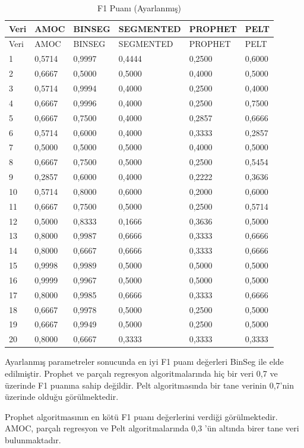 \documentclass[12pt,twoside]{deuthesis}
\begin{document}
\begin{longtable}[]{@{}llllll@{}}
\caption{\label{tab:nvar10} F1 Puanı (Ayarlanmış)}\tabularnewline
\toprule
Veri & AMOC & BINSEG & SEGMENTED & PROPHET & PELT\tabularnewline
\midrule
\endfirsthead
\toprule
Veri & AMOC & BINSEG & SEGMENTED & PROPHET & PELT\tabularnewline
\midrule
\endhead
1 & 0,5714 & 0,9997 & 0,4444 & 0,2500 & 0,6000\tabularnewline
2 & 0,6667 & 0,5000 & 0,5000 & 0,4000 & 0,5000\tabularnewline
3 & 0,5714 & 0,9994 & 0,4000 & 0,2500 & 0,4000\tabularnewline
4 & 0,6667 & 0,9996 & 0,4000 & 0,2500 & 0,7500\tabularnewline
5 & 0,6667 & 0,7500 & 0,4000 & 0,2857 & 0,6666\tabularnewline
6 & 0,5714 & 0,6000 & 0,4000 & 0,3333 & 0,2857\tabularnewline
7 & 0,5000 & 0,5000 & 0,5000 & 0,4000 & 0,5000\tabularnewline
8 & 0,6667 & 0,7500 & 0,5000 & 0,2500 & 0,5454\tabularnewline
9 & 0,2857 & 0,6000 & 0,4000 & 0,2222 & 0,3636\tabularnewline
10 & 0,5714 & 0,8000 & 0,6000 & 0,2000 & 0,6000\tabularnewline
11 & 0,6667 & 0,7500 & 0,5000 & 0,2500 & 0,5714\tabularnewline
12 & 0,5000 & 0,8333 & 0,1666 & 0,3636 & 0,5000\tabularnewline
13 & 0,8000 & 0,9987 & 0,6666 & 0,3333 & 0,6666\tabularnewline
14 & 0,8000 & 0,6667 & 0,6666 & 0,3333 & 0,6666\tabularnewline
15 & 0,9998 & 0,9989 & 0,5000 & 0,5000 & 0,5000\tabularnewline
16 & 0,9999 & 0,9967 & 0,5000 & 0,5000 & 0,5000\tabularnewline
17 & 0,8000 & 0,9985 & 0,6666 & 0,3333 & 0,6666\tabularnewline
18 & 0,6667 & 0,9978 & 0,5000 & 0,2500 & 0,5000\tabularnewline
19 & 0,6667 & 0,9949 & 0,5000 & 0,2500 & 0,5000\tabularnewline
20 & 0,8000 & 0,6667 & 0,3333 & 0,3333 & 0,3333\tabularnewline
\bottomrule
\end{longtable}

Ayarlanmış parametreler sonucunda en iyi F1 puanı değerleri BinSeg ile elde edilmiştir. Prophet ve parçalı regresyon algoritmalarında hiç bir veri 0,7 ve üzerinde F1 puanına sahip değildir. Pelt algoritmasında bir tane verinin 0,7'nin üzerinde olduğu görülmektedir.

Prophet algoritmasının en kötü F1 puanı değerlerini verdiği görülmektedir. AMOC, parçalı regresyon ve Pelt algoritmalarında 0,3 'ün altında birer tane veri bulunmaktadır.
\end{document}
